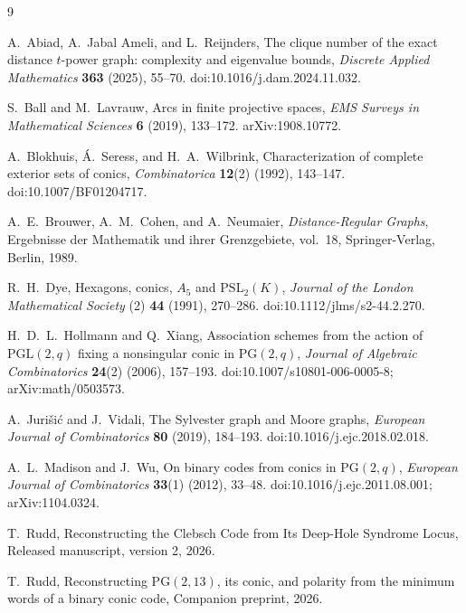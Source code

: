 \documentclass[11pt]{article}
\theoremstyle{remark}
\newcommand{\PG}{\mathrm{PG}}
\begin{document}
\begin{thebibliography}{9}

A.~Abiad, A.~Jabal Ameli, and L.~Reijnders,
\newblock The clique number of the exact distance $t$-power graph:
complexity and eigenvalue bounds,
\newblock \emph{Discrete Applied Mathematics} \textbf{363} (2025), 55--70.
\newblock doi:10.1016/j.dam.2024.11.032.

S.~Ball and M.~Lavrauw,
\newblock Arcs in finite projective spaces,
\newblock \emph{EMS Surveys in Mathematical Sciences} \textbf{6} (2019),
133--172.
\newblock arXiv:1908.10772.

A.~Blokhuis, Á.~Seress, and H.~A.~Wilbrink,
\newblock Characterization of complete exterior sets of conics,
\newblock \emph{Combinatorica} \textbf{12}(2) (1992), 143--147.
\newblock doi:10.1007/BF01204717.

A.~E.~Brouwer, A.~M.~Cohen, and A.~Neumaier,
\newblock \emph{Distance-Regular Graphs},
\newblock Ergebnisse der Mathematik und ihrer Grenzgebiete, vol.~18,
Springer-Verlag, Berlin, 1989.

R.~H.~Dye,
\newblock Hexagons, conics, $A_5$ and $\mathrm{PSL}_2(K)$,
\newblock \emph{Journal of the London Mathematical Society} (2) \textbf{44}
(1991), 270--286.
\newblock doi:10.1112/jlms/s2-44.2.270.

H.~D.~L.~Hollmann and Q.~Xiang,
\newblock Association schemes from the action of
$\mathrm{PGL}(2,q)$ fixing a nonsingular conic in $\PG(2,q)$,
\newblock \emph{Journal of Algebraic Combinatorics} \textbf{24}(2)
(2006), 157--193.
\newblock doi:10.1007/s10801-006-0005-8; arXiv:math/0503573.

A.~Juri\v{s}i\'c and J.~Vidali,
\newblock The Sylvester graph and Moore graphs,
\newblock \emph{European Journal of Combinatorics} \textbf{80} (2019),
184--193.
\newblock doi:10.1016/j.ejc.2018.02.018.

A.~L.~Madison and J.~Wu,
\newblock On binary codes from conics in $\PG(2,q)$,
\newblock \emph{European Journal of Combinatorics} \textbf{33}(1)
(2012), 33--48.
\newblock doi:10.1016/j.ejc.2011.08.001; arXiv:1104.0324.

T.~Rudd,
\newblock Reconstructing the Clebsch Code from Its Deep-Hole Syndrome Locus,
\newblock Released manuscript, version 2, 2026.

T.~Rudd,
\newblock Reconstructing $\PG(2,13)$, its conic, and polarity from the minimum words of a binary conic code,
\newblock Companion preprint, 2026.

\end{thebibliography}
\end{document}
